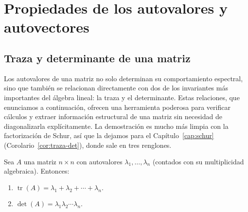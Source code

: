 \section{Propiedades de los autovalores y autovectores}
\subsection{Traza y determinante de una matriz}

Los autovalores de una matriz no solo determinan su comportamiento espectral, sino que también se relacionan directamente con dos de los invariantes más importantes del álgebra lineal: la traza y el determinante. Estas relaciones, que enunciamos a continuación, ofrecen una herramienta poderosa para verificar cálculos y extraer información
estructural de una matriz sin necesidad de diagonalizarla explícitamente. La demostración
es mucho más limpia con la factorización de Schur, así que la dejamos para el
Capítulo~\ref{cap:schur} (Corolario~\ref{cor:traza-det}), donde sale en tres renglones.

\begin{thm}
Sea $A$ una matriz $n\times n$ con autovalores $\lambda_1, \dots, \lambda_n$ (contados con su multiplicidad algebraica). Entonces:
\begin{enumerate}
\item $\operatorname{tr}(A) = \lambda_1 + \lambda_2 + \cdots + \lambda_n$.
\item $\det(A) = \lambda_1 \lambda_2 \cdots \lambda_n$.
\end{enumerate}
\end{thm}




